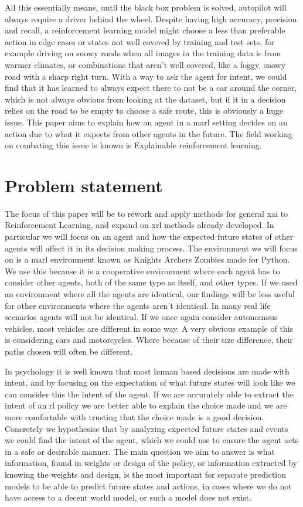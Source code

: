 \documentclass[UKenglish]{uiomasterthesis}
\begin{document}
All this essentially means, until the black box problem is solved, autopilot will always require a driver behind the wheel\cite{tian2018deeptest}. Despite having high accuracy, precision and recall, a reinforcement learning model might choose a less than preferable action in edge cases or states not well covered by training and test sets, for example driving on snowy roads when all images in the training data is from warmer climates, or combinations that aren't well covered, like a foggy, snowy road with a sharp right turn.
With a way to ask the agent for intent, we could find that it has learned to always expect there to not be a car around the corner, which is not always obvious from looking at the dataset, but if it in a decision relies on the road to be empty to choose a safe route, this is obviously a huge issue. This paper aims to explain how an agent in a \ac{marl} setting decides on an action due to what it expects from other agents in the future. The field working on combating this issue is known is Explainable reinforcement learning.

\section{Problem statement}
\label{sec:problem}
The focus of this paper will be to rework and apply methods for general \ac{xai} to Reinforcement Learning, and expand on \ac{xrl} methods already developed. In particular we will focus on an agent and how the expected future states of other agents will affect it in its decision making process. The environment we will focus on is a \ac{marl} environment known as Knights Archers Zombies \cite{KAZ} made for Python. We use this because it is a cooperative environment where each agent has to consider other agents, both of the same type as itself, and other types. If we used an environment where all the agents are identical, our findings will be less useful for other environments where the agents aren't identical. In many real life scenarios agents will not be identical. If we once again consider autonomous vehicles, most vehicles are different in some way. A very obvious example of this is considering cars and motorcycles. Where because of their size difference, their paths chosen will often be different.

In psychology it is well known that most human based decisions are made with intent\cite{inbook}, and by focusing on the expectation of what future states will look like we can consider this the intent of the agent. If we are accurately able to extract the intent of an \ac{rl} policy we are better able to explain the choice made and we are more comfortable with trusting that the choice made is a good decision. Concretely we hypothesise that by analyzing expected future states and events we could find the intent of the agent, which we could use to ensure the agent acts in a safe or desirable manner. The main question we aim to answer is what information, found in weights or design of the policy, or information extracted by knowing the weights and design, is the most important for separate prediction models to be able to predict future states and actions, in cases where we do not have access to a decent world model, or such a model does not exist.
\end{document}
